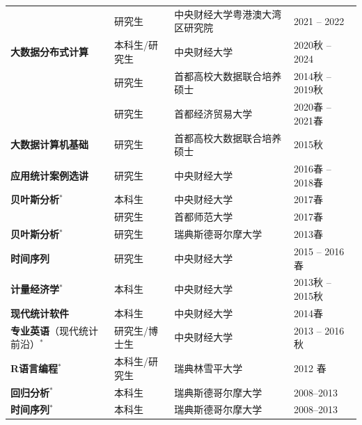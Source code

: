\documentclass[twoside,a4paper,11pt]{article}
\begin{document}
\begin{center}
{\begin{tabular}{llll}
                                                & 研究生                & 中央财经大学粤港澳大湾区研究院 & 2021 -- 2022     \\
      \textbf{大数据分布式计算}                 & 本科生/研究生         & 中央财经大学                   & 2020秋 -- 2024   \\
                                                & 研究生                & 首都高校大数据联合培养硕士     & 2014秋 -- 2019秋 \\
                                                & 研究生                & 首都经济贸易大学               & 2020春 -- 2021春 \\
      \textbf{大数据计算机基础}                 & 研究生                & 首都高校大数据联合培养硕士     & 2015秋           \\
      \textbf{应用统计案例选讲}                 & 研究生                & 中央财经大学                   & 2016春 -- 2018春 \\
      \textbf{贝叶斯分析}$^*$                   & 本科生                & 中央财经大学                   & 2017春           \\
                                                & 研究生                & 首都师范大学                   & 2017春           \\
      \textbf{贝叶斯分析}$^*$                   & 研究生                & 瑞典斯德哥尔摩大学             & 2013春           \\
      \textbf{时间序列}                         & 研究生                & 中央财经大学                   & 2015 -- 2016春   \\
      \textbf{计量经济学}$^*$                   & 本科生                & 中央财经大学                   & 2013秋 -- 2015秋 \\
      \textbf{现代统计软件}                     & 本科生                & 中央财经大学                   & 2014春           \\
      \textbf{专业英语}（现代统计前沿）$^*$     & 研究生/博士生         & 中央财经大学                   & 2013 -- 2016秋   \\
      \textbf{R语言编程}$^*$                    & 本科生/研究生         & 瑞典林雪平大学                 & 2012 春          \\
      \textbf{回归分析}$^*$                     & 本科生                & 瑞典斯德哥尔摩大学             & 2008--2013       \\
      \textbf{时间序列}$^*$                     & 本科生                & 瑞典斯德哥尔摩大学             & 2008--2013       \\
      \bottomrule
    \end{tabular}
  }
\end{center}
\end{document}
